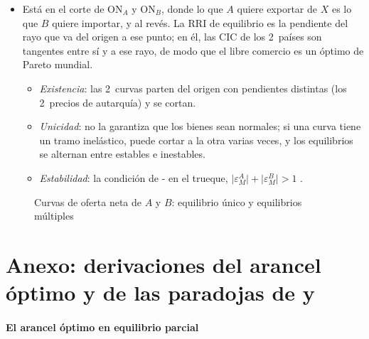 \documentclass[11pt]{article}
\begin{document}
\begin{itemize}
\item Está en el corte de ON$_A$ y ON$_B$, donde lo que $A$ quiere exportar de $X$ es lo que $B$ quiere importar, y al revés. La RRI de equilibrio es la pendiente del rayo que va del origen a ese punto; en él, las CIC de los 2~países son tangentes entre sí y a ese rayo, de modo que el libre comercio es un óptimo de Pareto mundial.
  \begin{itemize}
  \item \emph{Existencia}: las 2~curvas parten del origen con pendientes distintas (los 2~precios de autarquía) y se cortan.
  \item \emph{Unicidad}: no la garantiza que los bienes sean normales; si una curva tiene un tramo inelástico, puede cortar a la otra varias veces, y los equilibrios se alternan entre estables e inestables.
  \item \emph{Estabilidad}: la condición de - en el trueque, $\lvert\varepsilon^A_M\rvert+\lvert\varepsilon^B_M\rvert>1$  .
  \end{itemize}
\end{itemize}
\begin{figure}[H]
\centering
\caption{Curvas de oferta neta de $A$ y $B$: equilibrio único y equilibrios múltiples}\label{fig:anexo-ofertas-netas}
\end{figure}

\section{Anexo: derivaciones del arancel óptimo\cortetitulo{} y de las paradojas de  y }\label{anexo:derivaciones}

\paragraph{El arancel óptimo en equilibrio parcial}
\end{document}
